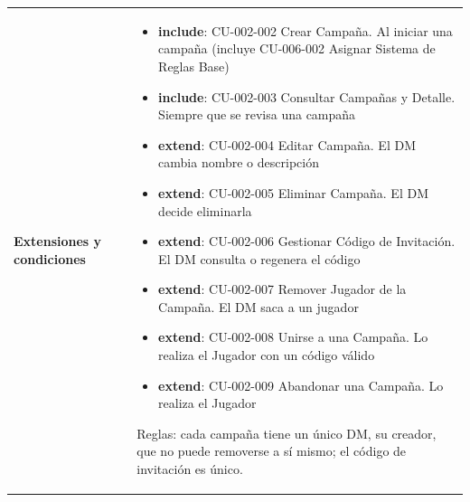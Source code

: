 {\begin{longtable}{|>{\raggedright\arraybackslash\bfseries}p{3.2cm}|>{\raggedright\arraybackslash}p{11.9cm}|}
Extensiones y condiciones & \begin{itemize}[itemsep=2pt,topsep=2pt]
\item \textbf{include}: CU-002-002 Crear Campaña. Al iniciar una campaña (incluye CU-006-002 Asignar Sistema de Reglas Base)
\item \textbf{include}: CU-002-003 Consultar Campañas y Detalle. Siempre que se revisa una campaña
\item \textbf{extend}: CU-002-004 Editar Campaña. El DM cambia nombre o descripción
\item \textbf{extend}: CU-002-005 Eliminar Campaña. El DM decide eliminarla
\item \textbf{extend}: CU-002-006 Gestionar Código de Invitación. El DM consulta o regenera el código
\item \textbf{extend}: CU-002-007 Remover Jugador de la Campaña. El DM saca a un jugador
\item \textbf{extend}: CU-002-008 Unirse a una Campaña. Lo realiza el Jugador con un código válido
\item \textbf{extend}: CU-002-009 Abandonar una Campaña. Lo realiza el Jugador
\end{itemize}
Reglas: cada campaña tiene un único DM, su creador, que no puede removerse a sí mismo; el código de invitación es único.


\end{longtable}}
